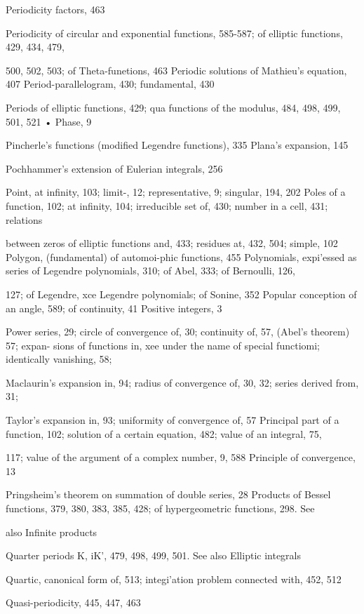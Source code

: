 %
%
Periodicity factors, 463

Periodicity of circular and exponential functions, 585-587; of elliptic functions, 429, 434, 479,

500, 502, 503; of Theta-funetions, 463
Periodic solutions of Mathieu's equation, 407
Period-parallelogram, 430; fundamental, 430

Periods of elliptic functions, 429; qua functions of the modulus, 484, 498, 499, 501, 521 •
Phase, 9

Pincherle's functions (modified Legendre functions), 335
Plana's expansion, 145

Pochhammer's extension of Eulerian integrals, 256

Point, at infinity, 103; limit-, 12; representative, 9; singular, 194, 202
Poles of a function, 102; at infinity, 104; irreducible set of, 430; number in a cell, 431; relations

between zeros of elliptic functions and, 433; residues at, 432, 504; simple, 102
Polygon, (fundamental) of automoi-phic functions, 455
Polynomials, expi'essed as series of Legendre polynomials, 310; of Abel, 333; of Bernoulli, 126,

127; of Legendre, xce Legendre polynomials; of Sonine, 352
Popular conception of an angle, 589; of continuity, 41
Positive integers, 3

Power series, 29; circle of convergence of, 30; continuity of, 57, (Abel's theorem) 57; expan-
sions of functions in, xee under the name  of special functiomi; identically vanishing, 58;

Maclaurin's expansion in, 94; radius of convergence of, 30, 32; series derived from, 31;

Taylor's expansion in, 93; uniformity of convergence of, 57
Principal part of a function, 102; solution of a certain equation, 482; value of an integral, 75,

117; value of the argument of a complex number, 9, 588
Principle of convergence, 13

Pringsheim's theorem on summation of double series, 28
Products of Bessel functions, 379, 380, 383, 385, 428; of hypergeometric functions, 298. See

also Infinite products

Quarter periods K, iK', 479, 498, 499, 501. See also Elliptic integrals

Quartic, canonical form of, 513; integi'ation problem connected with, 452, 512

Quasi-periodicity, 445, 447, 463

